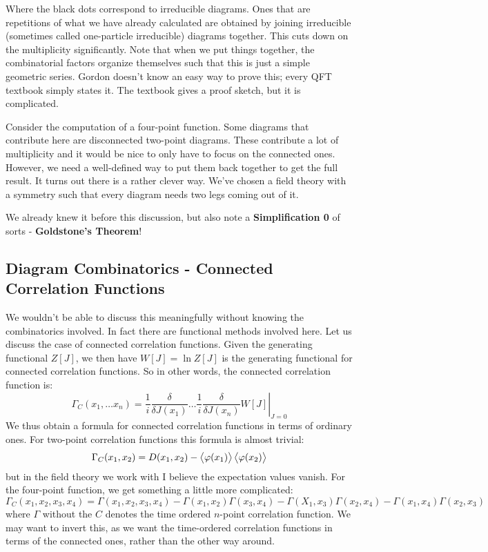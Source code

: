 Where the black dots correspond to irreducible diagrams. Ones that are repetitions of what we have already calculated are obtained by joining irreducible (sometimes called one-particle irreducible) diagrams together. This cuts down on the multiplicity significantly. Note that when we put things together, the combinatorial factors organize themselves such that this is just a simple geometric series. Gordon doesn't know an easy way to prove this; every QFT textbook simply states it. The textbook gives a proof sketch, but it is complicated.

Consider the computation of a four-point function. Some diagrams that contribute here are disconnected two-point diagrams. These contribute a lot of multiplicity and it would be nice to only have to focus on the connected ones. However, we need a well-defined way to put them back together to get the full result. It turns out there is a rather clever way. We've chosen a field theory with a symmetry such that every diagram needs two legs coming out of it.

We already knew it before this discussion, but also note a \textbf{Simplification 0} of sorts - \textbf{Goldstone's Theorem}!

\subsection{Diagram Combinatorics - Connected Correlation Functions}
We wouldn't be able to discuss this meaningfully without knowing the combinatorics involved. In fact there are functional methods involved here. Let us discuss the case of connected correlation functions. Given the generating functional $Z[J]$, we then have $W[J] = \ln Z[J]$ is the generating functional for connected correlation functions. So in other words, the connected correlation function is:
\begin{equation}
    \Gamma_C(x_1, \ldots x_n) = \left.\frac{1}{i}\frac{\delta}{\delta J(x_1)} \ldots \frac{1}{i}\frac{\delta}{\delta J(x_n)}W[J]\right|_{J = 0}
\end{equation}
We thus obtain a formula for connected correlation functions in terms of ordinary ones. For two-point correlation functions this formula is almost trivial:
\begin{equation}
    \Gamma_C(x_1, x_2) = D(x_1, x_2) - \avg{\varphi(x_1)}\avg{\varphi(x_2)}
\end{equation}
but in the field theory we work with I believe the expectation values vanish. For the four-point function, we get something a little more complicated:
\begin{equation}
    \Gamma_C(x_1, x_2, x_3, x_4) = \Gamma(x_1, x_2, x_3, x_4) - \Gamma(x_1, x_2)\Gamma(x_3, x_4) - \Gamma(X_1, x_3)\Gamma(x_2, x_4) - \Gamma(x_1, x_4)\Gamma(x_2, x_3)
\end{equation}
where $\Gamma$ without the $C$ denotes the time ordered $n$-point correlation function. We may want to invert this, as we want the time-ordered correlation functions in terms of the connected ones, rather than the other way around. 

